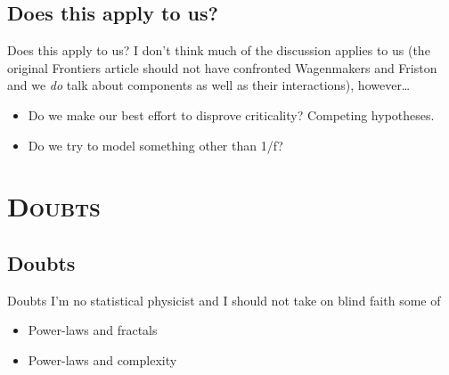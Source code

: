 \documentclass[xcolor=x11names,compress]{beamer}
\renewcommand{\(}{\begin{columns}}
\renewcommand{\)}{\end{columns}}
\newcommand{\<}[1]{\begin{column}{#1}}
\renewcommand{\>}{\end{column}}
\begin{document}
\subsection{Does this apply to us?}
\begin{frame}{Does this apply to us?}
    I don't think much of the discussion applies to us (the original Frontiers article should not have confronted Wagenmakers and Friston and we \emph{do} talk about components as well as their interactions), however\ldots
    \begin{itemize}
        \item Do we make our best effort to disprove criticality? Competing hypotheses.
        \item Do we try to model something other than 1/f?
    \end{itemize}
\end{frame}


\section{\scshape Doubts}
\subsection{Doubts}
\begin{frame}{Doubts}
I'm no statistical physicist and I should not take on blind faith some of 
    \begin{itemize}
        \item Power-laws and fractals
        \item Power-laws and complexity
    \end{itemize}
\end{frame}
\end{document}
